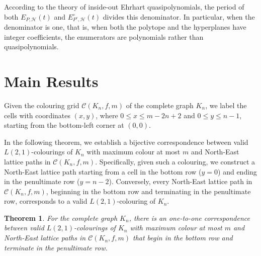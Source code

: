\documentclass{birkjour}
\newtheorem{theorem}{Theorem}[section]
\theoremstyle{definition}
\theoremstyle{remark}
\numberwithin{equation}{section}
\begin{document}
According to the theory of inside-out Ehrhart quasipolynomials, the period of both \( E_{P, \mathcal{H}}(t) \) and \( E^{\circ}_{P^{\circ}, \mathcal{H}}(t) \) divides this denominator. In particular, when the denominator is one, that is, when both the polytope and the hyperplanes have integer coefficients, the enumerators are polynomials rather than quasipolynomials.





\section{Main Results}
Given the colouring grid \( \mathcal{C}(K_n, f, m) \) of the complete graph \( K_n \), we label the cells with coordinates \( (x, y) \), where \( 0 \leq x \leq m-2n+2 \) and \( 0 \leq y \leq n-1 \), starting from the bottom-left corner at \( (0, 0) \).

In the following theorem, we establish a bijective correspondence between valid \( L(2,1) \)-colourings of \( K_n \) with maximum colour at most \( m \) and North-East lattice paths in \( \mathcal{C}(K_n, f, m) \). Specifically, given such a colouring, we construct a North-East lattice path starting from a cell in the bottom row (\( y = 0 \)) and ending in the penultimate row (\( y = n-2 \)). Conversely, every North-East lattice path in \( \mathcal{C}(K_n, f, m) \), beginning in the bottom row and terminating in the penultimate row, corresponds to a valid \( L(2,1) \)-colouring of \( K_n \).


\begin{theorem}
\label{t1}
For the complete graph \( K_n \), there is an one-to-one correspondence between valid \( L(2,1) \)-colourings of \( K_n \) with maximum colour at most \( m \) and North-East lattice paths in \( \mathcal{C}(K_n, f, m) \) that begin in the bottom row and terminate in the penultimate row.
\end{theorem}
\end{document}
